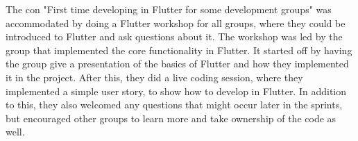 The con "First time developing in Flutter for some development groups" was accommodated by doing a Flutter workshop for all groups, where they could be introduced to Flutter and ask questions about it. The workshop was led by the group that implemented the core functionality in Flutter. It started off by having the group give a presentation of the basics of Flutter and how they implemented it in the project. After this, they did a live coding session, where they implemented a simple user story, to show how to develop in Flutter. In addition to this, they also welcomed any questions that might occur later in the sprints, but encouraged other groups to learn more and take ownership of the code as well.